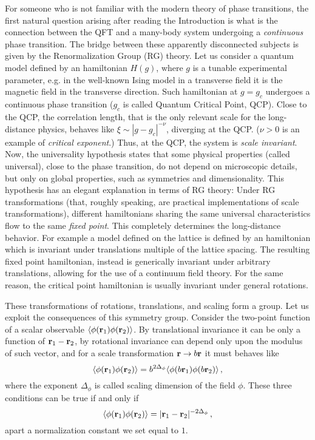 \documentclass{ws-ijqi}
\def\be{\begin{equation}}
\def\ee{\end{equation}}
\begin{document}
For someone who is not familiar with the modern theory of phase transitions,
the first natural question arising after reading the Introduction is 
what is the connection between the QFT and a 
many-body system undergoing a {\it continuous} phase transition. 
The bridge between these apparently disconnected subjects is given by
the Renormalization Group (RG) theory.\cite{cardybook}
Let us consider a quantum model defined by an hamiltonian $H(g)$, where
$g$ is a tunable experimental parameter, e.g. in the well-known Ising model
in a transverse field it is the magnetic field in the transverse 
direction.\cite{sach}
Such hamiltonian at $g=g_c$ undergoes a continuous phase transition 
($g_c$ is called Quantum Critical Point, QCP).
Close to the QCP, the correlation length, 
that is the only relevant scale for the long-distance physics, 
behaves like $\xi\sim |g-g_c|^{-\nu}$, diverging at the QCP. 
($\nu>0$ is an example of {\it critical exponent}.)
Thus, at the QCP, the system is {\it scale invariant}. 
Now, the universality hypothesis states that some physical properties (called
universal), close to the phase transition, do not depend on 
microscopic details, but only 
on global properties, such as symmetries and dimensionality.
This hypothesis has an elegant explanation in terms of RG theory:
Under RG transformations (that, roughly speaking, are practical 
implementations of scale transformations), 
different hamiltonians sharing the same universal 
characteristics flow to the same {\em fixed point}. 
This completely determines the long-distance behavior. 
For example a model defined on the lattice is
defined by an hamiltonian which is invariant under translations multiple of 
the lattice spacing. The resulting fixed point hamiltonian, instead is 
generically invariant under arbitrary translations, allowing for the use of 
a continuum field theory.
For the same reason, the critical point hamiltonian is usually invariant 
under general rotations.

These transformations of rotations, translations, and scaling form a 
group. Let us exploit the consequences of this symmetry group.
Consider the two-point function of a scalar observable 
$\langle \phi({\bf r}_1) \phi({\bf r}_2) \rangle$.
By translational invariance it can be only a function of 
${\bf r}_1- {\bf r}_2$, by rotational invariance can depend only upon
the modulus of such vector, and for a scale transformation 
${\bf r}\to b{\bf r}$ it must behaves like
\be
\langle \phi({\bf r}_1) \phi({\bf r}_2)\rangle=b^{2 \Delta_\phi}
\langle \phi(b {\bf r}_1) \phi(b{\bf r}_2)\rangle\,,
\label{scaltra}
\ee
where the exponent $\Delta_\phi$ is called scaling dimension of the field $\phi$.
These three conditions can be true if and only if
\be
\langle \phi({\bf r}_1) \phi({\bf r}_2)\rangle=
|{\bf r}_1-{\bf r}_2|^{-2 \Delta_\phi}\,,
\label{2ptsca}
\ee
apart a normalization constant we set equal to $1$.
\end{document}

